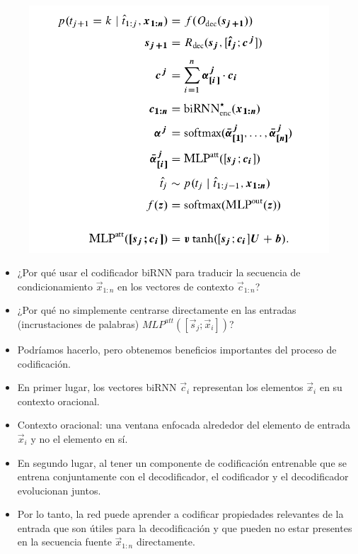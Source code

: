 \begin{figure}[h]
  \centering
  \includegraphics[scale=0.3]{pics/attentionformula.png}
\end{figure}

\begin{itemize}
\item ¿Por qué usar el codificador biRNN para traducir la secuencia de condicionamiento $\vec{x}_{1:n}$ en los vectores de contexto $\vec{c}_{1:n}$?
\item ¿Por qué no simplemente centrarse directamente en las entradas (incrustaciones de palabras) $MLP^{att}([\vec{s}_j;\vec{x}_i])$?
\item Podríamos hacerlo, pero obtenemos beneficios importantes del proceso de codificación.
\item En primer lugar, los vectores biRNN $\vec{c}_i$ representan los elementos $\vec{x}_i$ en su contexto oracional.
\item Contexto oracional: una ventana enfocada alrededor del elemento de entrada $\vec{x}_i$ y no el elemento en sí.
\item En segundo lugar, al tener un componente de codificación entrenable que se entrena conjuntamente con el decodificador, el codificador y el decodificador evolucionan juntos.
\item Por lo tanto, la red puede aprender a codificar propiedades relevantes de la entrada que son útiles para la decodificación y que pueden no estar presentes en la secuencia fuente $\vec{x}_{1:n}$ directamente.
\end{itemize}



